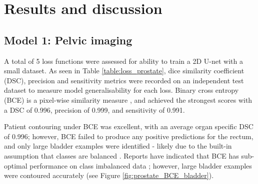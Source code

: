 \chapter{Results and discussion}
\label{ch:results}

\section{Model 1: Pelvic imaging}
A total of 5 loss functions were assessed for ability to train a 2D U-net with a small dataset. As seen in Table \ref{table:loss_prostate}, dice similarity coefficient (DSC), precision and sensitivity metrics were recorded on an independent test dataset to measure model generalisability for each loss. Binary cross entropy (BCE) is a pixel-wise similarity measure \cite{Bertels2019},
and achieved the strongest scores with a DSC of 0.996, precision of 0.999, and sensitivity of 0.991. 

\newpage

Patient contouring under BCE was excellent,
with an average organ specific DSC of 0.996; however, BCE failed to produce any positive predictions for the rectum, and only large bladder examples were identified - likely due to the built-in assumption that classes are balanced \cite{Ronneberger_2015}. Reports have indicated that BCE has sub-optimal performance on class imbalanced data \cite{taghanaki2018}; however, large bladder examples were contoured accurately
(see Figure \ref{fig:prostate_BCE_bladder}).  


